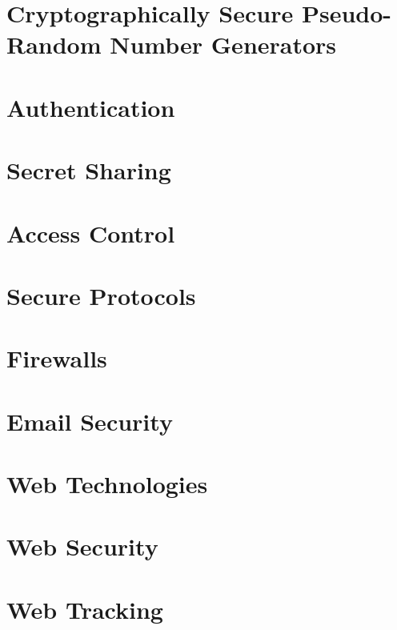 	\section{Cryptographically Secure Pseudo-Random Number Generators}
	
	\newpage
	\section{Authentication}

	\newpage
	\section{Secret Sharing}

	\newpage
	\section{Access Control}

	\newpage
	\section{Secure Protocols}
	
	\newpage
	\section{Firewalls}

	\newpage
	\section{Email Security}

	\newpage
	\section{Web Technologies}	
	
	\newpage
	\section{Web Security}	
	
	\newpage
	\section{Web Tracking}	
		
